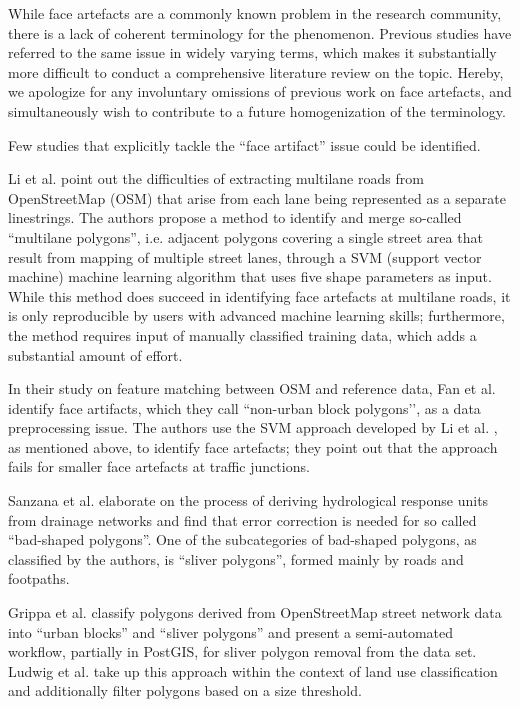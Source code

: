 While face artefacts are a commonly known problem in the research community, there is a lack of coherent terminology for the phenomenon. Previous studies have referred to the same issue in widely varying terms, which makes it substantially more difficult to conduct a comprehensive literature review on the topic. Hereby, we apologize for any involuntary omissions of previous work on face artefacts, and simultaneously wish to contribute to a future homogenization of the terminology.

Few studies that explicitly tackle the ``face artifact'' issue could be identified. 

Li et al. \cite{li_polygon-based_2014} point out the difficulties of extracting multilane roads from OpenStreetMap (OSM) that arise from each lane being represented as a separate linestrings. The authors propose a method to identify and merge so-called ``multilane polygons'', i.e. adjacent polygons covering a single street area that result from mapping of multiple street lanes, through a SVM (support vector machine) machine learning algorithm that uses five shape parameters as input. While this method does succeed in identifying face artefacts at multilane roads, it is only reproducible by users with advanced machine learning skills; furthermore, the method requires input of manually classified training data, which adds a substantial amount of effort.

In their study on feature matching between OSM and reference data, Fan et al. \cite{fan_polygon-based_2016} identify face artifacts, which they call ``non-urban block polygons’’, as a data preprocessing issue. The authors use the SVM approach developed by Li et al. \cite{li_polygon-based_2014}, as mentioned above, to identify face artefacts; they point out that the approach fails for smaller face artefacts at traffic junctions.

Sanzana et al. \cite{sanzana_decomposition_2018} elaborate on the process of deriving hydrological response units from drainage networks and find that error correction is needed for so called ``bad-shaped polygons''. One of the subcategories of bad-shaped polygons, as classified by the authors, is ``sliver polygons'', formed mainly by roads and footpaths. 

Grippa et al. \cite{grippa_mapping_2018} classify polygons derived from OpenStreetMap street network data into ``urban blocks'' and ``sliver polygons'' and present a semi-automated workflow, partially in PostGIS, for sliver polygon removal from the data set. Ludwig et al. \cite{ludwig_mapping_2021} take up this approach within the context of land use classification and additionally filter polygons based on a size threshold. 

